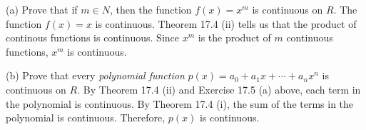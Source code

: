 
(a) Prove that if $m\in N$, then the function $f(x)=x^m$ is continuous
on $R$.
\medskip
The function $f(x)=x$ is continuous. Theorem 17.4 (ii) tells us that the product
of continous functions is continuous.
Since $x^m$ is the product of $m$ continuous functions, $x^m$ is continuous.

\medskip
(b) Prove that every {\it polynomial function}
$p(x)=a_0+a_1x+\cdots+a_nx^n$ is continuous on $R$.
\medskip
By Theorem 17.4 (ii) and Exercise 17.5 (a) above, each term in the polynomial
is continuous.
By Theorem 17.4 (i), the sum of the terms in the polynomial is continuous.
Therefore, $p(x)$ is continuous.

